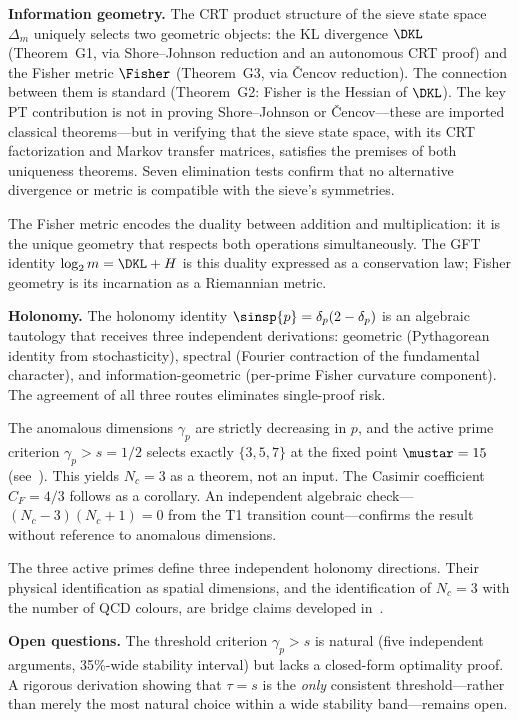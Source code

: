 \documentclass[12pt,a4paper]{article}
\begin{document}
\textbf{Information geometry.}
The CRT product structure of the sieve state space $\Delta_m$ uniquely
selects two geometric objects: the KL divergence $\DKL$ (Theorem~G1,
via Shore--Johnson reduction and an autonomous CRT proof) and the
Fisher metric $\Fisher$ (Theorem~G3, via \v{C}encov reduction).  The
connection between them is standard (Theorem~G2: Fisher is the Hessian
of $\DKL$).  The key PT contribution is not in proving Shore--Johnson
or \v{C}encov---these are imported classical theorems---but in
verifying that the sieve state space, with its CRT factorization and
Markov transfer matrices, satisfies the premises of both uniqueness
theorems.  Seven elimination tests confirm that no alternative
divergence or metric is compatible with the sieve's symmetries.

The Fisher metric encodes the duality between addition and
multiplication: it is the unique geometry that respects both
operations simultaneously.  The GFT identity $\log_2 m = \DKL + H$
is this duality expressed as a conservation law; Fisher geometry is
its incarnation as a Riemannian metric.

\textbf{Holonomy.}
The holonomy identity $\sinsp{p} = \delta_p(2 - \delta_p)$ is an
algebraic tautology that receives three independent derivations:
geometric (Pythagorean identity from stochasticity), spectral (Fourier
contraction of the fundamental character), and information-geometric
(per-prime Fisher curvature component).  The agreement of all three
routes eliminates single-proof risk.

The anomalous dimensions $\gamma_p$ are strictly decreasing in $p$,
and the active prime criterion $\gamma_p > s = 1/2$ selects exactly
$\{3, 5, 7\}$ at the fixed point $\mustar = 15$
(see~\cite{companion_M3}).  This yields $N_c = 3$ as a theorem, not
an input.  The Casimir coefficient $C_F = 4/3$ follows as a
corollary.  An independent algebraic check---$(N_c - 3)(N_c + 1)
= 0$ from the T1 transition count---confirms the result without
reference to anomalous dimensions.

The three active primes define three independent holonomy directions.
Their physical identification as spatial dimensions, and the
identification of $N_c = 3$ with the number of QCD colours, are
bridge claims developed in~\cite{companion_M5}.

\textbf{Open questions.}
The threshold criterion $\gamma_p > s$ is natural (five independent
arguments, 35\%-wide stability interval) but lacks a closed-form
optimality proof.  A rigorous derivation showing that $\tau = s$ is
the \emph{only} consistent threshold---rather than merely the most
natural choice within a wide stability band---remains open.
\end{document}
